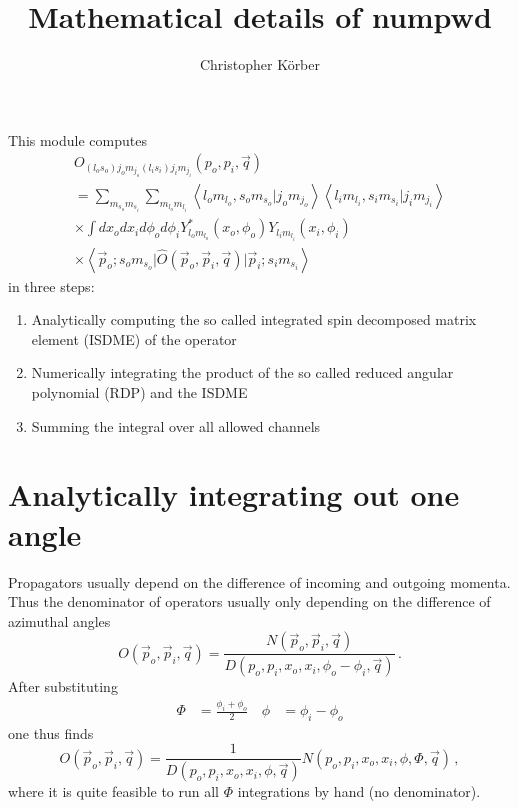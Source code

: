 \documentclass[onecolumn]{revtex4-2}
\begin{document}
\title{Mathematical details of numpwd}
\author{Christopher K\"orber}
\maketitle


This module computes
\begin{multline}\label{def:pwd}
    O_{(l_o s_o)j_o m_{j_o} (l_i s_i)j_i m_{j_i}}(p_o, p_i, \vec{q})
    \\ =
    \sum\limits_{m_{s_o} m_{s_i}}
    \sum\limits_{m_{l_o} m_{l_i}}
    \left\langle
        l_o m_{l_o}, s_o m_{s_o} \big\vert j_o m_{j_o}
    \right\rangle
    \left\langle
        l_i m_{l_i}, s_i m_{s_i} \big\vert j_i m_{j_i}
    \right\rangle
    \\ \times
    \int d x_o d x_i d \phi_o d \phi_i
    Y_{l_o m_{l_o}}^*(x_o, \phi_o)
    Y_{l_i m_{l_i}}(x_i, \phi_i)
    \\ \times
    \left\langle
        \vec p_o; s_o m_{s_o}
        \big\vert
        \hat O(\vec p_o, \vec p_i, \vec q)
        \big\vert
        \vec p_i; s_i m_{s_i}
    \right\rangle
\end{multline}
in three steps:
\begin{enumerate}
    \item Analytically computing the so called integrated spin decomposed matrix element (ISDME) of the operator
    \item Numerically integrating the product of the so called reduced angular polynomial (RDP) and the ISDME
    \item Summing the integral over all allowed channels
\end{enumerate}

\section{Analytically integrating out one angle}

Propagators usually depend on the difference of incoming and outgoing momenta.
Thus the denominator of operators usually only depending on the difference of azimuthal angles
\begin{equation}
    O(\vec p_o, \vec p_i, \vec q)
    =
    \frac{N(\vec p_o, \vec p_i, \vec q)}{D(p_o, p_i, x_o, x_i, \phi_o - \phi_i, \vec q)}
    \, .
\end{equation}
After substituting
\begin{align}
    \Phi &= \frac{\phi_i + \phi_o}{2}
    \, &
    \phi &= \phi_i - \phi_o
\end{align}
one thus finds
\begin{equation}
    O(\vec p_o, \vec p_i, \vec q)
    =
    \frac{1}{D(p_o, p_i, x_o, x_i, \phi, \vec q)}
    N(p_o, p_i, x_o, x_i, \phi, \Phi, \vec q)
    \, ,
\end{equation}
where it is quite feasible to run all $\Phi$ integrations by hand (no denominator).
\end{document}
